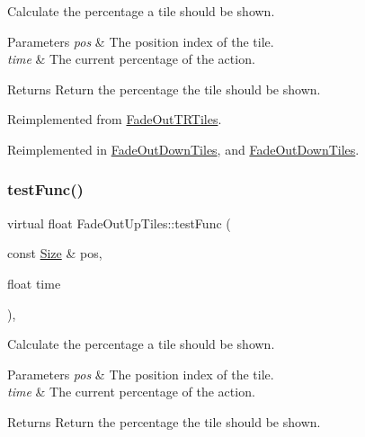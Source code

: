Calculate the percentage a tile should be shown. 


\begin{DoxyParams}{Parameters}
{\em pos} & The position index of the tile. \\
\hline
{\em time} & The current percentage of the action. \\
\hline
\end{DoxyParams}
\begin{DoxyReturn}{Returns}
Return the percentage the tile should be shown. 
\end{DoxyReturn}


Reimplemented from \hyperlink{classFadeOutTRTiles_aed87971151a43d41b598a8c65f0e7d8f}{Fade\+Out\+T\+R\+Tiles}.



Reimplemented in \hyperlink{classFadeOutDownTiles_a650db33238577e696174930b01d06045}{Fade\+Out\+Down\+Tiles}, and \hyperlink{classFadeOutDownTiles_a6fa98b6fda5e72b41542f4209866c3f3}{Fade\+Out\+Down\+Tiles}.

\mbox{\label{classFadeOutUpTiles_ac01a15f89dca9a3a4c1585031abf6d2c}} 
\subsubsection{\texorpdfstring{test\+Func()}{testFunc()}\hspace{0.1cm}{\footnotesize\ttfamily [2/2]}}
{\footnotesize\ttfamily virtual float Fade\+Out\+Up\+Tiles\+::test\+Func (\begin{DoxyParamCaption}\item[{const \hyperlink{classSize}{Size} \&}]{pos,  }\item[{float}]{time }\end{DoxyParamCaption})\hspace{0.3cm}{\ttfamily [override]}, {\ttfamily [virtual]}}



Calculate the percentage a tile should be shown. 


\begin{DoxyParams}{Parameters}
{\em pos} & The position index of the tile. \\
\hline
{\em time} & The current percentage of the action. \\
\hline
\end{DoxyParams}
\begin{DoxyReturn}{Returns}
Return the percentage the tile should be shown. 
\end{DoxyReturn}


